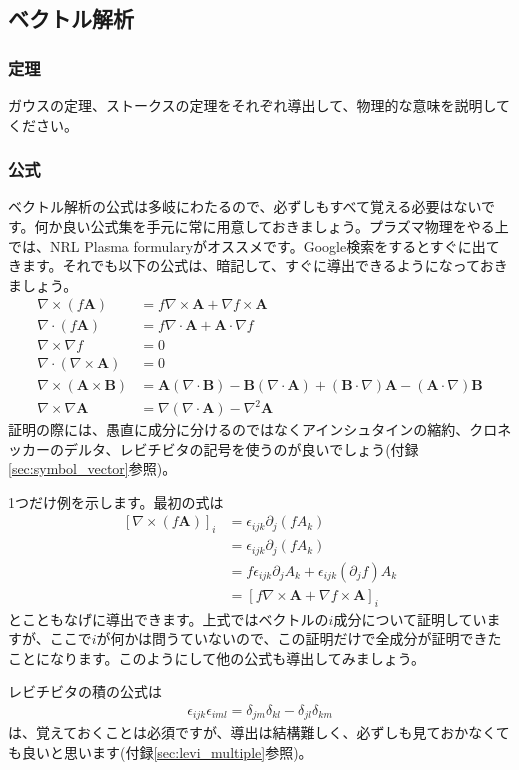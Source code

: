 \documentclass{ltjarticle}
\begin{document}
\subsection{ベクトル解析}
\subsubsection{定理}
ガウスの定理、ストークスの定理をそれぞれ導出して、物理的な意味を説明してください。
\subsubsection{公式}
ベクトル解析の公式は多岐にわたるので、必ずしもすべて覚える必要はないです。何か良い公式集を手元に常に用意しておきましょう。プラズマ物理をやる上では、NRL Plasma formularyがオススメです。Google検索をするとすぐに出てきます。それでも以下の公式は、暗記して、すぐに導出できるようになっておきましょう。
\begin{align*}
    \nabla\times(f\bm{A}) &= f\nabla\times\bm{A} + \nabla f \times \bm{A}\\
    \nabla\cdot(f\bm{A}) &= f\nabla\cdot\bm{A} + \bm{A}\cdot\nabla f\\
    \nabla\times \nabla f &= 0 \\
    \nabla \cdot \left(\nabla \times \bm{A}\right) &= 0 \\
    \nabla \times(\bm{A}\times\bm{B}) &= \bm{A}\left(\nabla\cdot\bm{B}\right) - \bm{B}\left(\nabla\cdot\bm{A}\right)
    + \left(\bm{B}\cdot\nabla\right)\bm{A} - \left(\bm{A}\cdot\nabla\right)\bm{B}\\
    \nabla\times\nabla\bm{A} &= \nabla\left(\nabla\cdot\bm{A}\right) - \nabla^2 \bm{A}
\end{align*}
証明の際には、愚直に成分に分けるのではなくアインシュタインの縮約、クロネッカーのデルタ、レビチビタの記号を使うのが良いでしょう(付録\ref{sec:symbol_vector}参照)。\par
1つだけ例を示します。最初の式は
\begin{align}
    \left[\nabla\times\left(f\bm{A}\right)\right]_i &= \epsilon_{ijk}\partial_j \left(fA_k\right) \nonumber\\
    & = \epsilon_{ijk}\partial_j \left(fA_k\right) \nonumber\\
    & = f\epsilon_{ijk} \partial_j A_k + \epsilon_{ijk}\left(\partial_j f\right) A_k \nonumber\\
    & = \left[f\nabla\times \bm{A} + \nabla f \times \bm{A}\right]_i
\end{align}
とこともなげに導出できます。上式ではベクトルの$i$成分について証明していますが、ここで$i$が何かは問うていないので、この証明だけで全成分が証明できたことになります。このようにして他の公式も導出してみましょう。
\par
レビチビタの積の公式は
\begin{align}
    \epsilon_{ijk}\epsilon_{iml} = \delta_{jm}\delta_{kl} - \delta_{jl}\delta_{km}
\end{align}
は、覚えておくことは必須ですが、導出は結構難しく、必ずしも見ておかなくても良いと思います(付録\ref{sec:levi_multiple}参照)。
\end{document}
